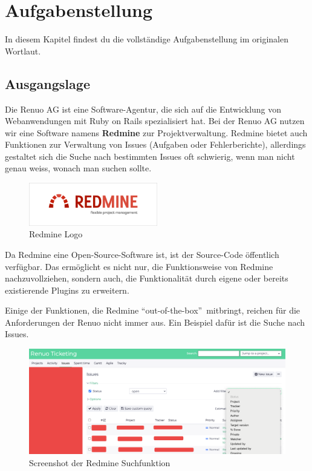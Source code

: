 \chapter{Aufgabenstellung}

In diesem Kapitel findest du die vollständige Aufgabenstellung im originalen Wortlaut.

\section{Ausgangslage}

Die Renuo AG ist eine Software-Agentur, die sich auf die Entwicklung von Webanwendungen mit Ruby on Rails spezialisiert hat. Bei der Renuo AG nutzen wir eine Software namens \textbf{Redmine} zur Projektverwaltung. Redmine bietet auch Funktionen zur Verwaltung von Issues (Aufgaben oder Fehlerberichte), allerdings gestaltet sich die Suche nach bestimmten Issues oft schwierig, wenn man nicht genau weiss, wonach man suchen sollte.

\begin{figure}[h]
    \centering
    \includegraphics[width=0.5\textwidth]{images/redmine.png}
    \caption{Redmine Logo}
    \label{fig:redmine}
\end{figure}

Da Redmine eine Open-Source-Software ist, ist der Source-Code öffentlich verfügbar. Das ermöglicht es nicht nur, die Funktionsweise von Redmine nachzuvollziehen, sondern auch, die Funktionalität durch eigene oder bereits existierende Plugins zu erweitern.

Einige der Funktionen, die Redmine \textquotedblleft out-of-the-box\textquotedblright\ mitbringt, reichen für die Anforderungen der Renuo nicht immer aus. Ein Beispiel dafür ist die Suche nach Issues.

\begin{figure}[h]
    \centering
    \includegraphics[width=1\textwidth]{images/redmine-search.png}
    \caption{Screenshot der Redmine Suchfunktion}
    \label{fig:redmine-search}
\end{figure}

